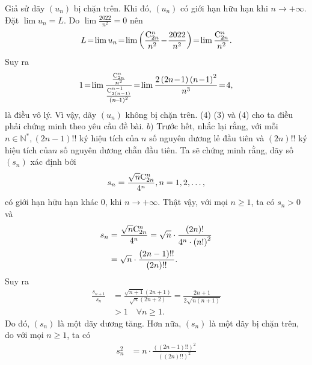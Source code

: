 \begin{multicols}{2}
	\vskip 0.05cm
	Giả sử dãy $(u_n)$  bị chặn trên. Khi đó, $(u_n)$  có giới hạn hữu hạn khi  $n \to + \infty$. Đặt $\lim {u_n} = L.$
	\vskip 0.05cm 
	Do $\lim \frac{{2022}}{{{n^2}}} = 0$  nên
	\begin{align*}
		L \!=\! \lim {u_n} \!=\! \lim \left( {\frac{{{\rm{C}}_{2n}^n}}{{{n^2}}} \!-\! \frac{{2022}}{{{n^2}}}} \right) \!=\! \lim \frac{{{\rm{C}}_{2n}^n}}{{{n^2}}}.
	\end{align*}
	Suy ra
	\begin{align*}
		1 \!=\! \lim \frac{{\frac{{{\rm{C}}_{2n}^n}}{{{n^2}}}}}{{\frac{{{\rm{C}}_{2\left( {n - 1} \right)}^{n - 1}}}{{{{\left( {n \!-\! 1} \right)}^2}}}}} \!=\! \lim \frac{{2\left( {2n \!-\! 1} \right){{\left( {n \!-\! 1} \right)}^2}}}{{{n^3}}} \!=\! 4,
	\end{align*}
	là điều vô lý. Vì vậy, dãy  $(u_n)$ không bị chặn trên.                            \hfill ($4$)
	\vskip 0.05cm
	($3$) và ($4$) cho ta điều phải chứng minh theo yêu cầu đề bài.
	\vskip 0.05cm
	$b)$ Trước hết, nhắc lại rằng, với mỗi $n \in \mathbb{N^*}, (2n-1)!!$    ký hiệu tích của $n$ số nguyên dương lẻ đầu tiên và $(2n)!!$  ký hiệu tích của$ n$ số nguyên dương chẵn đầu tiên.
	\vskip 0.05cm
	Ta sẽ chứng minh rằng, dãy số $(s_n)$  xác định bởi
	\begin{align*}
		{s_n} = \frac{{\sqrt n {\rm{C}}_{2n}^n}}{{{4^n}}}, n = 1,2,\ldots,
	\end{align*}
	có giới hạn hữu hạn khác $0$, khi $ n \to + \infty$.
	\vskip 0.05cm 
	Thật vậy, với mọi $n \ge  1$, ta có $s_n > 0$  và
	\begin{align*}
		{s_n} &= \frac{{\sqrt n {\rm{C}}_{2n}^n}}{{{4^n}}} = \sqrt n  \cdot \frac{{\left( {2n} \right)!}}{{{4^n} \cdot {{\left( {n!} \right)}^2}}} \\
		&= \sqrt n  \cdot \frac{{\left( {2n - 1} \right)!!}}{{\left( {2n} \right)!!}}.
	\end{align*}
	Suy ra
	\begin{align*}
		\frac{{{s_{n + 1}}}}{{{s_n}}} &= \frac{{\sqrt {n + 1} \left( {2n + 1} \right)}}{{\sqrt n \left( {2n + 2} \right)}} = \frac{{2n + 1}}{{2\sqrt {n\left( {n + 1} \right)} }} \\
		&> 1\quad\forall n \ge 1.
	\end{align*}
	Do đó, $(s_n)$  là một dãy dương tăng.
	\vskip 0.05cm
	Hơn nữa, $(s_n)$  là một dãy bị chặn trên, do với mọi $n \ge  1$, ta có
	\begin{align*}
		s_n^2 &= n \cdot \frac{{{{\left( {\left( {2n - 1} \right)!!} \right)}^2}}}{{{{\left( {\left( {2n} \right)!!} \right)}^2}}} \\

\end{align*}
\end{multicols}

